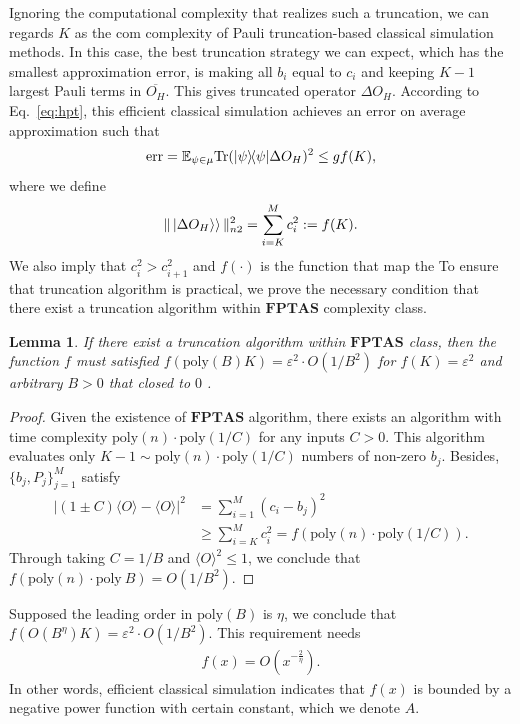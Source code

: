 \documentclass[showpacs,amsmath,amssymb,twocolumn,superscriptaddress,notitlepage,preprintnumbers,aps,pra,10pt,floatfix]{revtex4-2}
\newtheorem{lemma}{Lemma}
\begin{document}
\begin{appendix}
Ignoring the computational complexity that realizes such a truncation, we can regards $K$ as the com complexity of Pauli truncation-based classical simulation methods. 
In this case, the best truncation strategy we can expect, which has the smallest approximation error, is making all $b_i$ equal to $c_i$ and keeping $K-1$ largest Pauli terms in $\overline{O_H}$. This gives truncated operator $\Delta O_H$. 
According to Eq.~\eqref{eq:hpt}, this efficient classical simulation achieves an error on average approximation such that
\begin{eqnarray}
\text{err} =\mathbb{E}_{\psi\in\mu}\mathrm{Tr}(|\psi\rangle\!\langle\psi| \Delta O_H)^2 \leq  g f(K),
\end{eqnarray}
where we define
\begin{eqnarray}
\|\ket{\Delta O_{H}\rangle}\|_{n2}^2=\sum_{i=K}^M c_i^2:=f(K).
\end{eqnarray}
We also imply that $c_i^2 > c_{i+1}^2$ and $f(\cdot)$ is the function that map the  
To ensure that truncation algorithm is practical, we prove the necessary condition that there exist a truncation algorithm within $\textbf{FPTAS}$ complexity class.
\begin{lemma}
\label{lemma:FPTAS_condition}
   If there exist a truncation algorithm within $\textbf{FPTAS}$ class, then the function $f$ must satisfied $ f\left( \text{poly}(B)K \right) = \varepsilon^2 \cdot O(1/B^2)$ for $ f\left( K \right) = \varepsilon^2 $ and arbitrary $B>0$ that closed to $0$ .
\end{lemma}
\begin{proof}
    Given the existence of $\textbf{FPTAS}$ algorithm, there exists an algorithm with time complexity $\text{poly}(n) \cdot \text{poly}({1}/{C})$ for any inputs $C > 0$. This algorithm evaluates only $K-1 \sim \text{poly}(n)\cdot \text{poly}({1}/{C})$ numbers of non-zero $b_j$. Besides,  $\{b_j, P_j\}_{j =1}^{M}$ satisfy
    \begin{align}
     |(1\pm C)\langle O \rangle - \langle O \rangle|^2&=  \sum_{i=1}^M (c_i - b_j)^2 \\
     &\geq  \sum_{i = K}^{M} c_i^2 = f(\text{poly}(n) \cdot \text{poly}({1}/{C})).
    \end{align}
    Through taking $C = 1/B$ and $\langle O \rangle^2 \leq 1$, we conclude that $f(\text{poly}(n) \cdot \text{poly}~B) = O(1/B^2)$.
\end{proof}
Supposed the leading order in $\text{poly}(B)$ is $\eta$, we conclude that $ f\left( O(B^\eta) K \right) = \varepsilon^2 \cdot O(1/B^2)$. This requirement needs
\begin{eqnarray}
f(x)= O(x^{-\frac{2}{\eta}}).
\end{eqnarray}
In other words, efficient classical simulation indicates that $f(x)$ is bounded by a negative power function with certain constant, which we denote $A$.


\end{appendix}
\end{document}
